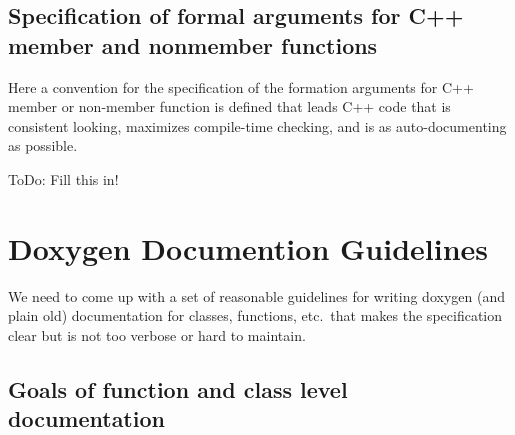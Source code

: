 %
\subsection{Specification of formal arguments for C++ member and nonmember functions}
%

Here a convention for the specification of the formation arguments for C++
member or non-member function is defined that leads C++ code that is
consistent looking, maximizes compile-time checking, and is as
auto-documenting as possible.

ToDo: Fill this in!

%
\section{Doxygen Documention Guidelines}
%

We need to come up with a set of reasonable guidelines for writing doxygen
(and plain old) documentation for classes, functions, etc.\ that makes the
specification clear but is not too verbose or hard to maintain.

%
\subsection{Goals of function and class level documentation}
%

